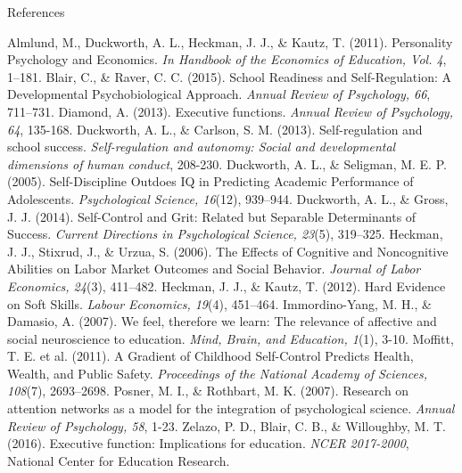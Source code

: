 \documentclass{beamer}
\begin{document}
\begin{frame}[allowframebreaks]{References}
    \footnotesize
    \begin{thebibliography}{99}
         Almlund, M., Duckworth, A. L., Heckman, J. J., \& Kautz, T. (2011). Personality Psychology and Economics. \textit{In Handbook of the Economics of Education, Vol. 4}, 1--181.
         Blair, C., \& Raver, C. C. (2015). School Readiness and Self-Regulation: A Developmental Psychobiological Approach. \textit{Annual Review of Psychology, 66}, 711--731.
         Diamond, A. (2013). Executive functions. \textit{Annual Review of Psychology, 64}, 135-168.
         Duckworth, A. L., \& Carlson, S. M. (2013). Self-regulation and school success. \textit{Self-regulation and autonomy: Social and developmental dimensions of human conduct}, 208-230.
         Duckworth, A. L., \& Seligman, M. E. P. (2005). Self-Discipline Outdoes IQ in Predicting Academic Performance of Adolescents. \textit{Psychological Science, 16}(12), 939--944.
         Duckworth, A. L., \& Gross, J. J. (2014). Self-Control and Grit: Related but Separable Determinants of Success. \textit{Current Directions in Psychological Science, 23}(5), 319--325.
         Heckman, J. J., Stixrud, J., \& Urzua, S. (2006). The Effects of Cognitive and Noncognitive Abilities on Labor Market Outcomes and Social Behavior. \textit{Journal of Labor Economics, 24}(3), 411--482.
         Heckman, J. J., \& Kautz, T. (2012). Hard Evidence on Soft Skills. \textit{Labour Economics, 19}(4), 451--464.
         Immordino-Yang, M. H., \& Damasio, A. (2007). We feel, therefore we learn: The relevance of affective and social neuroscience to education. \textit{Mind, Brain, and Education, 1}(1), 3-10.
         Moffitt, T. E. et al. (2011). A Gradient of Childhood Self-Control Predicts Health, Wealth, and Public Safety. \textit{Proceedings of the National Academy of Sciences, 108}(7), 2693--2698.
         Posner, M. I., \& Rothbart, M. K. (2007). Research on attention networks as a model for the integration of psychological science. \textit{Annual Review of Psychology, 58}, 1-23.
         Zelazo, P. D., Blair, C. B., \& Willoughby, M. T. (2016). Executive function: Implications for education. \textit{NCER 2017-2000}, National Center for Education Research.
    \end{thebibliography}
\end{frame}
\end{document}
